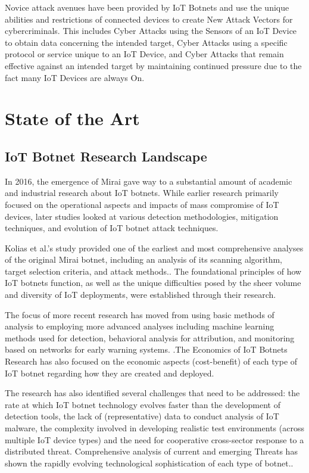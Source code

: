 \documentclass[12pt,letterpaper]{report}
\begin{document}
Novice attack avenues have been provided by IoT Botnets and use the unique abilities and restrictions of connected devices to create New Attack Vectors for cybercriminals. This includes Cyber Attacks using the Sensors of an IoT Device to obtain data concerning the intended target, Cyber Attacks using a specific protocol or service unique to an IoT Device, and Cyber Attacks that remain effective against an intended target by maintaining continued pressure due to the fact many IoT Devices are always On.

\chapter{State of the Art}

\section{IoT Botnet Research Landscape}

In 2016, the emergence of Mirai gave way to a substantial amount of academic and industrial research about IoT botnets. While earlier research primarily focused on the operational aspects and impacts of mass compromise of IoT devices, later studies looked at various detection methodologies, mitigation techniques, and evolution of IoT botnet attack techniques.

Kolias et al.'s study provided one of the earliest and most comprehensive analyses of the original Mirai botnet, including an analysis of its scanning algorithm, target selection criteria, and attack methods.\cite{kolias2017ddos}. The foundational principles of how IoT botnets function, as well as the unique difficulties posed by the sheer volume and diversity of IoT deployments, were established through their research.

The focus of more recent research has moved from using basic methods of analysis to employing more advanced analyses including machine learning methods used for detection, behavioral analysis for attribution, and monitoring based on networks for early warning systems. \cite{wang2022iot, sivanathan2020classifying}.The Economics of IoT Botnets Research has also focused on the economic aspects (cost-benefit) of each type of IoT botnet regarding how they are created and deployed.

The research has also identified several challenges that need to be addressed: the rate at which IoT botnet technology evolves faster than the development of detection tools, the lack of (representative) data to conduct analysis of IoT malware, the complexity involved in developing realistic test environments (across multiple IoT device types) and the need for cooperative cross-sector response to a distributed threat. Comprehensive analysis of current and emerging Threats has shown the rapidly evolving technological sophistication of each type of botnet.\cite{almousa2023evolution}.
\end{document}
